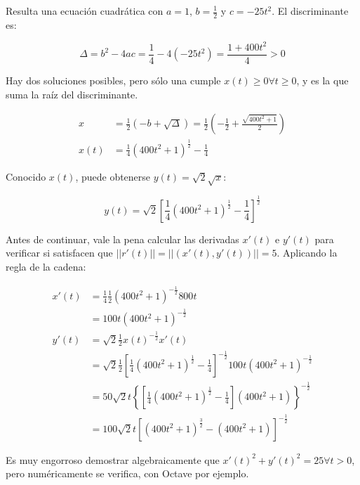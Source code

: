 \documentclass{article}
\begin{document}
Resulta una ecuación cuadrática con $a = 1$, $b = \frac{1}{2}$ y $c = -25t^2$. El discriminante es:

\begin{equation}
\Delta = b^2 - 4ac = \frac{1}{4} - 4 (-25 t^2) = \frac{1 + 400 t^2}{4} > 0
\end{equation}

Hay dos soluciones posibles, pero sólo una cumple $x(t) \geq 0 \forall t \geq 0$, y es la que suma la raíz del discriminante.

\begin{subequations}
\begin{align}
x &= \frac{1}{2} (-b + \sqrt{\Delta}) = \frac{1}{2} \left( -\frac{1}{2} + \frac{\sqrt{400t^2 + 1}}{2} \right) \\
x(t) &= \frac{1}{4} (400t^2 + 1)^\frac{1}{2} - \frac{1}{4}
\end{align}
\end{subequations}

Conocido $x(t)$, puede obtenerse $y(t) = \sqrt{2} \sqrt{x}$:

\begin{equation}
y(t) = \sqrt{2} \left[ \frac{1}{4} (400t^2 + 1)^\frac{1}{2} - \frac{1}{4} \right]^\frac{1}{2}
\end{equation}

Antes de continuar, vale la pena calcular las derivadas $x'(t)$ e $y'(t)$ para verificar si satisfacen que $||r'(t)|| = ||(x'(t), y'(t))|| = 5$. Aplicando la regla de la cadena:

\begin{subequations}
\begin{align}
x'(t) &= \frac{1}{4} \frac{1}{2} (400t^2 + 1)^{-\frac{1}{2}} 800t \\
&= 100t (400t^2 + 1)^{-\frac{1}{2}} \\
y'(t) &= \sqrt{2} \frac{1}{2} x(t)^{-\frac{1}{2}} x'(t) \\
&= \sqrt{2} \frac{1}{2} \left[ \frac{1}{4} (400t^2 + 1)^{\frac{1}{2}} - \frac{1}{4} \right]^{-\frac{1}{2}} 100t (400t^2 + 1)^{-\frac{1}{2}} \\
&= 50 \sqrt{2} t \left\{ \left[ \frac{1}{4} (400t^2 + 1)^{\frac{1}{2}} - \frac{1}{4} \right] (400t^2 + 1) \right\}^{-\frac{1}{2}} \\
&= 100 \sqrt{2} t \left[ (400t^2 + 1)^{\frac{3}{2}} - (400t^2 + 1) \right]^{-\frac{1}{2}}
\end{align}
\end{subequations}

Es muy engorroso demostrar algebraicamente que $x'(t)^2 + y'(t)^2 = 25 \forall t > 0$, pero numéricamente se verifica, con Octave por ejemplo.
\end{document}
